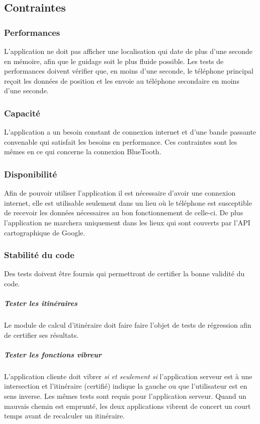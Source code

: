 \documentclass[12pt]{report}
\begin{document}
\subsection{Contraintes}
\subsubsection{Performances} L'application ne doit pas afficher une localisation qui date de plus d'une seconde en mémoire, afin que le guidage soit le plus fluide possible. Les tests de performances doivent vérifier que, en moins d'une seconde, le téléphone principal reçoit les données de position et les envoie au téléphone secondaire en moins d'une seconde.

\subsubsection{Capacité} L'application a un besoin constant de connexion internet et d'une bande passante convenable qui satisfait les besoins en performance. Ces contraintes sont les mêmes en ce qui concerne la connexion BlueTooth.

\subsubsection{Disponibilité}
Afin de pouvoir utiliser l'application il est nécessaire d'avoir une connexion internet, elle est utilisable seulement dans un lieu où le téléphone est susceptible de recevoir les données nécessaires au bon fonctionnement de celle-ci. De plus l'application ne marchera uniquement dans les lieux qui sont couverts par l'API cartographique de Google.

\subsubsection{Stabilité du code} Des tests doivent être fournis qui permettront de certifier la bonne validité du code. 
\subparagraph{Tester les itinéraires} Le module de calcul d'itinéraire doit faire faire l'objet de tests de régression afin de certifier ses résultats.
\subparagraph{Tester les fonctions vibreur} L'application cliente doit vibrer \emph{si et seulement si} l'application serveur est à une intersection et l'itinéraire (certifié) indique la gauche ou que l'utilisateur est en sens inverse. Les mêmes tests sont requis pour l'application serveur. Quand un mauvais chemin est emprunté, les deux applications vibrent de concert un court temps avant de recalculer un itinéraire.
\end{document}
